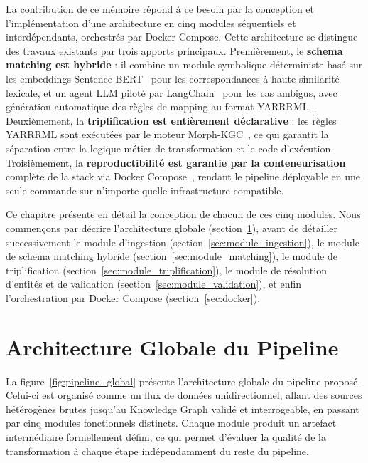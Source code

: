 La contribution de ce mémoire répond à ce besoin par la conception et
l'implémentation d'une architecture en cinq modules séquentiels et
interdépendants, orchestrés par Docker Compose.
Cette architecture se distingue des travaux existants par trois apports
principaux.
Premièrement, le \textbf{schema matching est hybride} : il combine un module
symbolique déterministe basé sur les embeddings Sentence-BERT~\cite{reimers2019sbert}
pour les correspondances à haute similarité lexicale, et un agent LLM piloté par
LangChain~\cite{langchain2023} pour les cas ambigus, avec génération automatique
des règles de mapping au format YARRRML~\cite{warren2024yarrrml}.
Deuxièmement, la \textbf{triplification est entièrement déclarative} : les règles
YARRRML sont exécutées par le moteur Morph-KGC~\cite{arenas2023morphkgc}, ce qui
garantit la séparation entre la logique métier de transformation et le code
d'exécution.
Troisièmement, la \textbf{reproductibilité est garantie par la conteneurisation}
complète de la stack via Docker Compose~\cite{docker2024}, rendant le pipeline
déployable en une seule commande sur n'importe quelle infrastructure compatible.

Ce chapitre présente en détail la conception de chacun de ces cinq modules.
Nous commençons par décrire l'architecture globale (section~\ref{sec:archi_globale}),
avant de détailler successivement le module d'ingestion
(section~\ref{sec:module_ingestion}), le module de schema matching hybride
(section~\ref{sec:module_matching}), le module de triplification
(section~\ref{sec:module_triplification}), le module de résolution d'entités et
de validation (section~\ref{sec:module_validation}), et enfin l'orchestration
par Docker Compose (section~\ref{sec:docker}).

\section{Architecture Globale du Pipeline}
\label{sec:archi_globale}

La figure~\ref{fig:pipeline_global} présente l'architecture globale du pipeline
proposé.
Celui-ci est organisé comme un flux de données unidirectionnel, allant des sources
hétérogènes brutes jusqu'au Knowledge Graph validé et interrogeable, en passant
par cinq modules fonctionnels distincts.
Chaque module produit un artefact intermédiaire formellement défini, ce qui permet
d'évaluer la qualité de la transformation à chaque étape indépendamment du reste
du pipeline.

